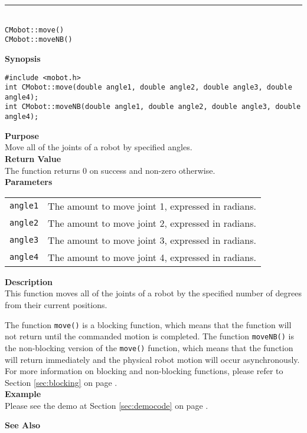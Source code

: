\noindent
\vspace{5pt}
\rule{4.5in}{0.015in}\\
\noindent
{\LARGE \texttt{CMobot::move()}}\\
{\LARGE \texttt{CMobot::moveNB()}}\\
{}

\noindent
{\bf Synopsis}\\
\begin{verbatim}
#include <mobot.h>
int CMobot::move(double angle1, double angle2, double angle3, double angle4);
int CMobot::moveNB(double angle1, double angle2, double angle3, double angle4);
\end{verbatim}

\noindent
{\bf Purpose}\\
Move all of the joints of a robot by specified angles.\\

\noindent
{\bf Return Value}\\
The function returns 0 on success and non-zero otherwise.\\

\noindent
{\bf Parameters}\\
\vspace{-0.1in}
\begin{description}
\item               
\begin{tabular}{p{15 mm}p{105 mm}}
\texttt{angle1} & The amount to move joint 1, expressed in radians. \\
\texttt{angle2} & The amount to move joint 2, expressed in radians. \\
\texttt{angle3} & The amount to move joint 3, expressed in radians. \\
\texttt{angle4} & The amount to move joint 4, expressed in radians. \\
\end{tabular}
\end{description}
\noindent
{\bf Description}\\
This function moves all of the joints of a robot by the specified number of degrees
from their current positions. 

The function \texttt{move()} is a blocking function,
which means that the function will not return until the commanded motion is 
completed. The function \texttt{moveNB()} is the non-blocking version of
the \texttt{move()} function, which means that the function will return
immediately and the physical robot motion will occur asynchronously. For 
more information on blocking and non-blocking functions, please refer to 
Section \ref{sec:blocking} on page \pageref{sec:blocking}.\\

\noindent
{\bf Example}\\
Please see the demo at Section \ref{sec:democode} on page \pageref{sec:democode}.\\
\noindent

\noindent
{\bf See Also}\\

